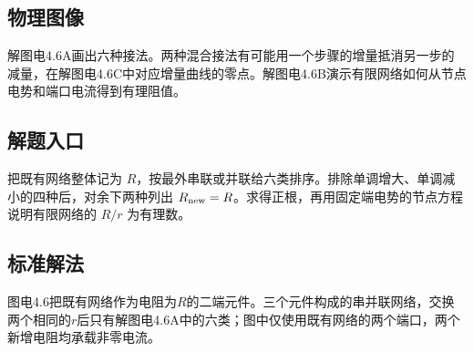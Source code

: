 \documentclass[UTF8,fontset=fandol,a4paper,11pt]{ctexart}
\begin{document}


\subsection*{物理图像}

解图电4.6A画出六种接法。两种混合接法有可能用一个步骤的增量抵消另一步的减量，在解图电4.6C中对应增量曲线的零点。解图电4.6B演示有限网络如何从节点电势和端口电流得到有理阻值。



\subsection*{解题入口}

把既有网络整体记为 $R$，按最外串联或并联给六类排序。排除单调增大、单调减小的四种后，对余下两种列出 $R_{\rm new}=R$。求得正根，再用固定端电势的节点方程说明有限网络的 $R/r$ 为有理数。


\subsection*{标准解法}

图电4.6把既有网络作为电阻为$R$的二端元件。三个元件构成的串并联网络，交换两个相同的$r$后只有解图电4.6A中的六类；图中仅使用既有网络的两个端口，两个新增电阻均承载非零电流。
\end{document}
